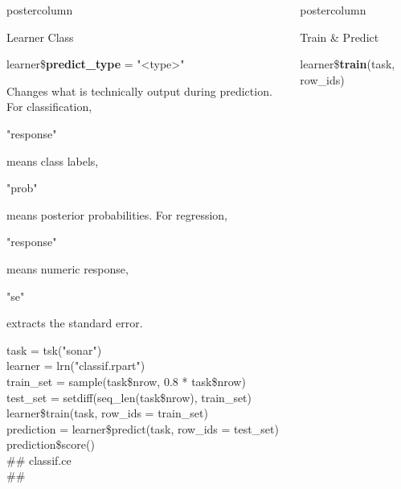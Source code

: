 \documentclass{beamer}
\newlength{\columnheight} %
\newcommand{\codeinline}[1]{\begin{codeboxinline}#1\end{codeboxinline}}
\begin{document}
\begin{frame}[fragile]{}
\begin{columns}
\begin{column}{.245\textwidth}
\begin{beamercolorbox}[center]{postercolumn}
\begin{minipage}{.98\textwidth}
{\begin{myblock}{Learner Class}
							\\
							\begin{codebox}
								learner\$\textbf{predict\_type} = "<type>"
							\end{codebox}
							Changes what is technically output during prediction. For classification, 
	                        \codeinline{"response"} means class labels, \codeinline{"prob"} means posterior probabilities.
	                        For regression, \codeinline{"response"} means numeric response, 
	                        \codeinline{"se"} extracts the standard error.
							\vspace{1em}
							\begin{codeboxexample}
								{\scriptsize
									task = tsk("sonar")\\
									learner = lrn("classif.rpart")
									\vspace{1em}
									\\
									train\_set = sample(task\$nrow, 0.8 * task\$nrow)\\
									test\_set = setdiff(seq\_len(task\$nrow), train\_set)
									\vspace{1em}
									\\
									learner\$train(task, row\_ids = train\_set)
									\vspace{1em}
									\\
									prediction = learner\$predict(task, row\_ids = test\_set)\\
									prediction\$score()\\
									\#\# classif.ce\\
									\#\# }
							\end{codeboxexample}
						\end{myblock}
					\vfill}
				\end{minipage}
			\end{beamercolorbox}
		\end{column}
		\begin{column}{.245\textwidth}
			\begin{beamercolorbox}[center]{postercolumn}
				\begin{minipage}{.98\textwidth}
					\parbox[t][\columnheight]{\textwidth}{
						\begin{myblock}{Train \& Predict}
							\vspace{0.25em}
							\begin{codebox}
								learner\$\textbf{train}(task, row\_ids)
							\end{codebox}

\end{myblock}}
\end{minipage}
\end{beamercolorbox}
\end{column}
\end{columns}
\end{frame}
\end{document}

